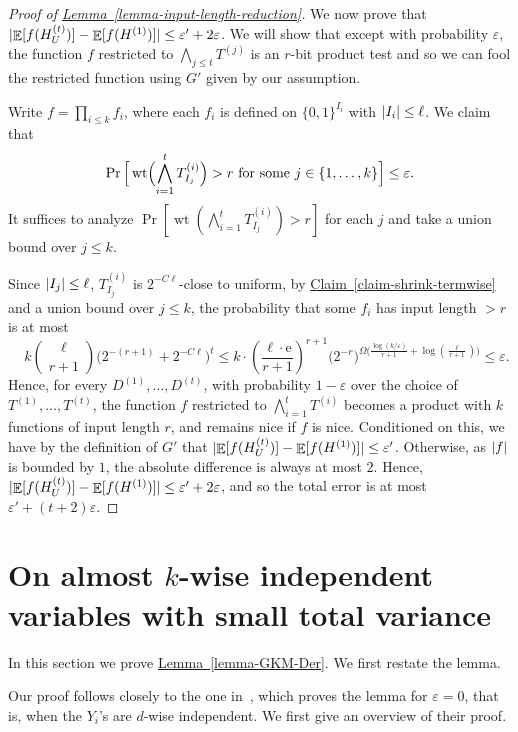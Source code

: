 \documentclass[11pt]{article}
\numberwithin{equation}{section}
\theoremstyle{definition}
\theoremstyle{plain}
\newcommand{\eee}{\mathrm e}
\newcommand{\expref}[2]{\hyperref[#2]{#1~\ref{#2}}}
\newcommand{\zo}{\{0,1\}}
\def\eps{\varepsilon}
\def\Blocklength{\ell}
\DeclarePairedDelimiter{\abs}{\lvert}{\rvert}
\DeclareMathOperator{\wtt}{wt}  %
\DeclareMathOperator*{\E}{\mathbb{E}}                 %
\begin{document}
\begin{proof}[Proof of {\expref{Lemma}{lemma-input-length-reduction}}]
We now prove that $\abs{\E[f(H^{(t)}_U)] - \E[f(H^{(1)})]} \le \eps' + 2\eps$.
We will show that except with probability $\eps$, the function $f$ restricted to 
$\bigwedge_{j \le t} T^{(j)}$ is an %
    $r$-bit  %
product test
%
and so we can fool the restricted function using $G'$ given by our assumption.

    Write $f = \prod_{i \le k} f_i$, where each $f_i$ is defined on $\zo^{I_i}$ with $\abs{I_i} \le \Blocklength$.
    We claim that
    \[
      \Pr \Big[ \wtt \Bigl(\bigwedge_{i=1}^t T^{(i)}_{I_j} \Bigr) > r \text{ for some $j \in \{1, \ldots, k\}$} \Big] \le \eps .
    \]
    It suffices to analyze $\Pr[\wtt(\bigwedge_{i=1}^t T_{I_j}^{(i)}) > r]$ for each $j$ and take a union bound over $j \le k$.

    Since $\abs{I_j} \le \Blocklength$, $T^{(i)}_{I_j}$ is $2^{-C\Blocklength}$-close to uniform, by \expref{Claim}{claim-shrink-termwise} and a union bound over $j \le k$, the probability that some $f_i$ has input length $> r$ is at most
    \[
      \quad k \binom{\Blocklength}{r+1} \bigl (2^{-(r+1)} + 2^{-C\Blocklength} \bigr)^t
  \le k \cdot \left(\frac{\Blocklength\cdot\eee}{r+1}\right)^{r+1} \bigl( 2^{-r} \bigr)^{\Omega \bigl( \frac{\log(k/\eps)}{r+1} + \log(\frac{\Blocklength}{r+1}) \big)}
      \le \eps .
    \]
    Hence, for every $D^{(1)}, \ldots, D^{(t)}$, with probability $1 - \eps$ over the choice of $T^{(1)}, \ldots, T^{(t)}$, the function $f$ restricted to 
    $\bigwedge_{i=1}^t T^{(i)}$
    becomes a product with $k$ functions of input length $r$, and remains nice if $f$ is nice.
    Conditioned on this, we have by the definition of $G'$ that $\abs{ \E[f(H_U^{(t)})] - \E[f(H^{(1)})] } \le \eps'$.
    Otherwise, as $\abs{f}$ is bounded by $1$, the absolute difference is always
    at most $2$.
    Hence, $\abs{ \E[f(H_U^{(t)})] - \E[f(H^{(1)})] } \le \eps' + 2 \eps$, and so the total error is at most $\eps' + (t + 2) \eps$.
  \end{proof}


  \section{On almost \texorpdfstring{$k$}{}-wise independent variables with small total variance} \label{sec:DerGKM}

  In this section we prove \expref{Lemma}{lemma-GKM-Der}.
  We first restate the lemma.

  \DerGKM*

  Our proof follows closely to the one in~\cite{GopalanKM18}, which proves the lemma for $\eps = 0$, that is, when the $Y_i$'s are $d$-wise independent.
  We first give an overview of their proof.
\end{document}

